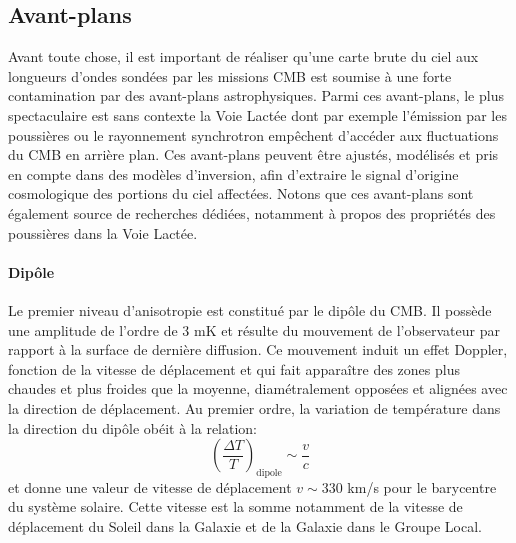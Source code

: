 \subsection{Avant-plans}

Avant toute chose, il est important de réaliser qu'une carte brute du ciel aux longueurs d'ondes sondées par les missions CMB est soumise à une forte contamination par des avant-plans astrophysiques. Parmi ces avant-plans, le plus spectaculaire est sans contexte la Voie Lactée dont par exemple l'émission  par les poussières ou le rayonnement synchrotron empêchent d'accéder aux fluctuations du CMB en arrière plan. Ces avant-plans peuvent être ajustés, modélisés et pris en compte dans des modèles d'inversion, afin d'extraire le signal d'origine cosmologique des portions du ciel affectées. Notons que ces avant-plans sont également source de recherches dédiées, notamment à propos des propriétés des poussières dans la Voie Lactée.

\paragraph{Dipôle} Le premier niveau d'anisotropie est constitué par le dipôle du CMB. Il possède une amplitude de l'ordre de 3 mK et résulte du mouvement de l'observateur par rapport à la surface de dernière diffusion. Ce mouvement induit un effet Doppler, fonction de la vitesse de déplacement et qui fait apparaître des zones plus chaudes et plus froides que la moyenne, diamétralement opposées et alignées avec la direction de déplacement. Au premier ordre, la variation de température dans la direction du dipôle obéit à la relation:
\begin{equation}
\left(\frac{\Delta T}{T}\right)_\mathrm{dipole}\sim \frac{v}{c}
\end{equation}
et donne une valeur de vitesse de déplacement $v\sim 330$ km/s pour le barycentre du système solaire. Cette vitesse est la somme notamment de la vitesse de déplacement du Soleil dans la Galaxie et de la Galaxie dans le Groupe Local.


